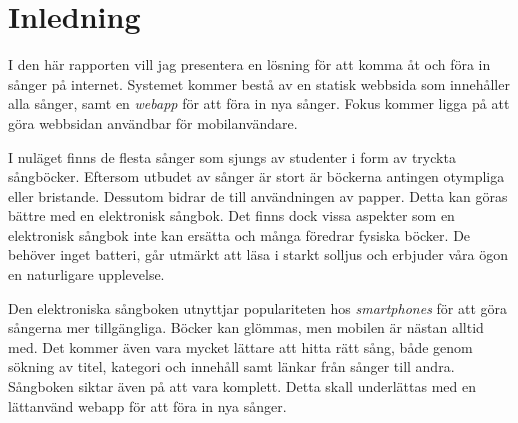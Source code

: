 \section{Inledning}

I den här rapporten vill jag presentera en lösning för att komma åt och föra in sånger på internet. Systemet kommer bestå av en statisk webbsida som innehåller alla sånger, samt en \emph{webapp} för att föra in nya sånger. Fokus kommer ligga på att göra webbsidan användbar för mobilanvändare.

I nuläget finns de flesta sånger som sjungs av studenter i form av tryckta sångböcker. Eftersom utbudet av sånger är stort är böckerna antingen otympliga eller bristande. Dessutom bidrar de till användningen av papper. Detta kan göras bättre med en elektronisk sångbok. Det finns dock vissa aspekter som en elektronisk sångbok inte kan ersätta och många föredrar fysiska böcker. De behöver inget batteri, går utmärkt att läsa i starkt solljus och erbjuder våra ögon en naturligare upplevelse.

Den elektroniska sångboken utnyttjar populariteten hos \emph{smartphones} för att göra sångerna mer tillgängliga. Böcker kan glömmas, men mobilen är nästan alltid med. Det kommer även vara mycket lättare att hitta rätt sång, både genom sökning av titel, kategori och innehåll samt länkar från sånger till andra. Sångboken siktar även på att vara komplett. Detta skall underlättas med en lättanvänd webapp för att föra in nya sånger.